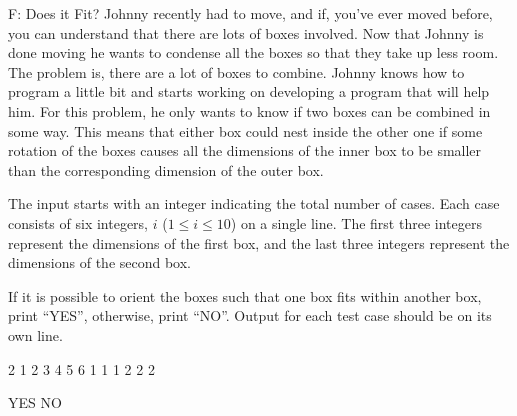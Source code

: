 \begin{problem}{F: Does it Fit?}
Johnny recently had to move, and if, you've ever moved before, you can understand that there are lots of boxes involved. 
Now that Johnny is done moving he wants to condense all the boxes so that they take up less room. 
The problem is, there are a lot of boxes to combine. 
Johnny knows how to program a little bit and starts working on developing a program that will help him. For this problem, he only wants to know if two boxes can be combined in some way. 
This means that either box could nest inside the other one if some rotation of the boxes causes all the dimensions of the inner box to be smaller than the corresponding dimension of the outer box.
\end{problem}

\begin{formalin}
The input starts with an integer indicating the total number of cases. 
Each case consists of six integers, $i$ ($1 \leq i \leq 10$) on a single line. 
The first three integers represent the dimensions of the first box, and the last three integers represent the dimensions of the second box.
\end{formalin}

\begin{formalout}
If it is possible to orient the boxes such that one box fits within another box, print ``YES'', otherwise, print ``NO''. 
Output for each test case should be on its own line.
\end{formalout}

\begin{datain}
2
1 2 3 4 5 6
1 1 1 2 2 2
\end{datain}

\begin{dataout}
YES
NO
\end{dataout}


